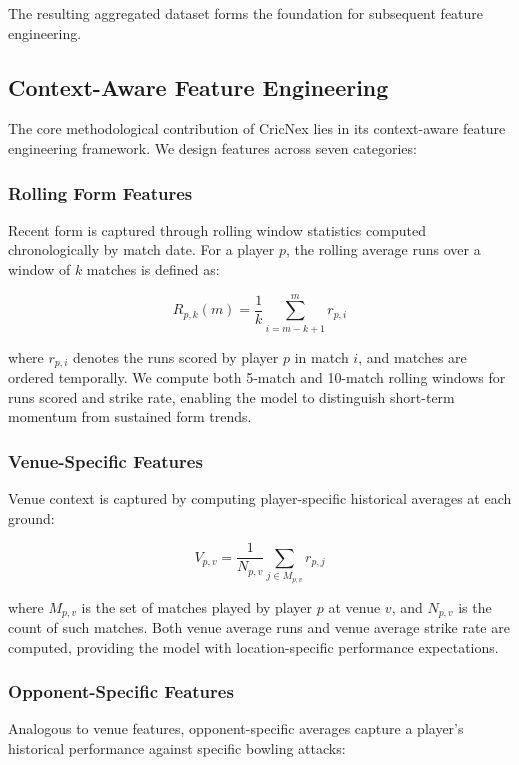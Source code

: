 \documentclass[conference]{IEEEtran}
\begin{document}
The resulting aggregated dataset forms the foundation for subsequent feature engineering.

\subsection{Context-Aware Feature Engineering}
The core methodological contribution of CricNex lies in its context-aware feature engineering framework. We design features across seven categories:

\subsubsection{Rolling Form Features}
Recent form is captured through rolling window statistics computed chronologically by match date. For a player \(p\), the rolling average runs over a window of \(k\) matches is defined as:

\begin{equation}
R_{p,k}(m) = \frac{1}{k} \sum_{i=m-k+1}^{m} r_{p,i}
\label{eq:rolling}
\end{equation}

where \(r_{p,i}\) denotes the runs scored by player \(p\) in match \(i\), and matches are ordered temporally. We compute both 5-match and 10-match rolling windows for runs scored and strike rate, enabling the model to distinguish short-term momentum from sustained form trends.

\subsubsection{Venue-Specific Features}
Venue context is captured by computing player-specific historical averages at each ground:

\begin{equation}
V_{p,v} = \frac{1}{N_{p,v}} \sum_{j \in M_{p,v}} r_{p,j}
\label{eq:venue}
\end{equation}

where \(M_{p,v}\) is the set of matches played by player \(p\) at venue \(v\), and \(N_{p,v}\) is the count of such matches. Both venue average runs and venue average strike rate are computed, providing the model with location-specific performance expectations.

\subsubsection{Opponent-Specific Features}
Analogous to venue features, opponent-specific averages capture a player's historical performance against specific bowling attacks:
\end{document}
